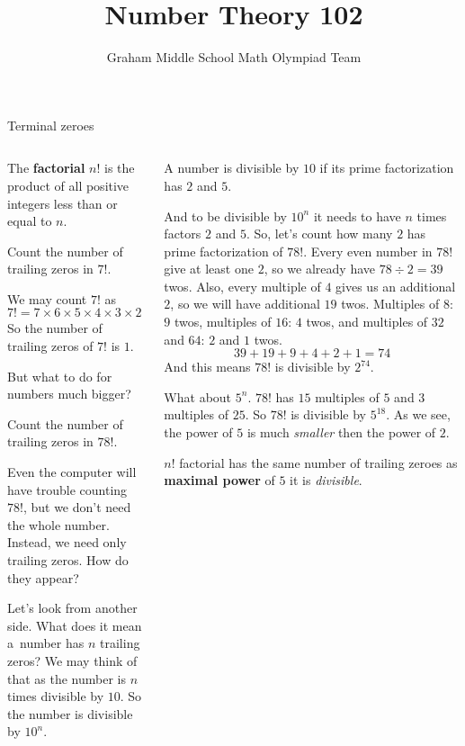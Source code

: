 \documentclass[9pt,aspectratio=169]{beamer}
\title{Number Theory 102}
\subtitle[Graham Middle School]{Graham Middle School Math Olympiad Team}
\begin{document}
\maketitle

\begin{frame}{Terminal zeroes}
  \begin{columns}[T]
    \begin{column}{0.5\textwidth}
      \begin{example}
        The \textbf{factorial} $n!$ is the product of all positive integers less than or equal to $n$.
      \end{example}
      \begin{problem}
        Count the number of trailing zeros in $7!$.
      \end{problem}
      We may count $7!$ as 
      \[ 7! = 7 \times 6 \times 5 \times 4 \times 3 \times 2 \times 1 = 5{,}040. \]
      So the number of trailing zeros of $7!$ is $1$.\smallskip

      But what to do for numbers much bigger?
      \begin{problem}
        Count the number of trailing zeros in $78!$.
      \end{problem}
      Even the computer will have trouble counting $78!$, but we don't need the whole number. Instead, we need only trailing zeros. How do they appear? 

      Let's look from another side. What does it mean a~number has $n$ trailing zeros? We may think of that as the number is $n$ times divisible by $10$. So the number is divisible by $10^n$.
    \end{column}
    \begin{column}{0.5\textwidth}
      \begin{definition}
        A number is divisible by $10$ if its prime factorization has $2$ and $5$.
      \end{definition}
      And to be divisible by $10^n$ it needs to have $n$ times factors $2$ and $5$. So, let's count how many $2$ has prime factorization of $78!$. Every even number in $78!$ give at least one $2$, so we already have $78 \div 2 = 39$ twos. Also, every multiple of $4$ gives us an additional $2$, so we will have additional $19$ twos. Multiples of $8$: $9$ twos, multiples of $16$: $4$ twos, and multiples of $32$ and $64$: $2$ and $1$ twos.
      \[ 39 + 19 + 9 + 4 + 2 + 1 = 74 \]
      And this means $78!$ is divisible by $2^{74}$.
      
      What about $5^n$. $78!$ has $15$ multiples of $5$ and $3$ multiples of $25$. So $78!$ is divisible by $5^{18}$. As we see, the power of $5$ is much \emph{smaller} then the power of $2$.
      \begin{definition}
        $n!$ factorial has the same number of trailing zeroes as \textbf{maximal power} of $5$ it is \emph{divisible}.
      \end{definition}
    \end{column}
  \end{columns}
\end{frame}
\end{document}
